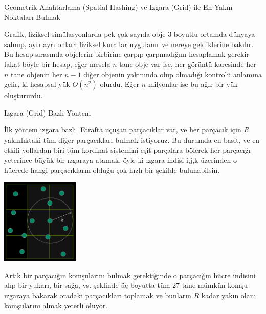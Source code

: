 \documentclass[12pt,fleqn]{article}\usepackage{../../common}
\begin{document}
Geometrik Anahtarlama (Spatial Hashing) ve Izgara (Grid) ile En Yakın Noktaları Bulmak

Grafik, fiziksel simülasyonlarda pek çok sayıda obje 3 boyutlu ortamda dünyaya
salınıp, ayrı ayrı onlara fiziksel kurallar uygulanır ve nereye geldiklerine
bakılır. Bu hesap sırasında objelerin birbirine çarpıp çarpmadığını hesaplamak
gerekir fakat böyle bir hesap, eğer mesela $n$ tane obje var ise, her görüntü
karesinde her $n$ tane objenin her $n-1$ diğer objenin yakınında olup olmadığı
kontrolü anlamına gelir, ki hesapsal yük $O(n^2)$ olurdu. Eğer $n$ milyonlar ise
bu ağır bir yük oluştururdu.

Izgara (Grid) Bazlı Yöntem

İlk yöntem ızgara bazlı. Etrafta uçuşan parçacıklar var, ve her parçacık için
$R$ yakınlıktaki tüm diğer parçacıkları bulmak istiyoruz. Bu durumda en basit,
ve en etkili yollardan biri tüm kordinat sistemini eşit parçalara bölerek her
parçacığı yeterince büyük bir ızgaraya atamak, öyle ki ızgara indisi i,j,k
üzerinden o hücrede hangi parçacıkların olduğu çok hızlı bir şekilde
bulunabilsin.  

\includegraphics[width=10em]{algs_073_hash_03.png}

Artık bir parçacığın komşularını bulmak gerektiğinde o parçacığın hücre indisini
alıp bir yukarı, bir sağa, vs. şeklinde üç boyutta tüm 27 tane mümkün komşu
ızgaraya bakarak oradaki parçacıkları toplamak ve bunların $R$ kadar yakın olanı
komşularını almak yeterli oluyor.
\end{document}
